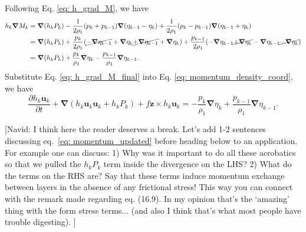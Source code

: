 Following Eq. \eqref{eq: h_grad_M}, we have
\begin{align}
    \begin{split}
        h_{k}\boldsymbol{\nabla} M_{k} & = \boldsymbol{\nabla} (h_{k}P_{k}) - 
        \frac{1}{2\rho_{1}}(p_{k} + p_{k-1}) \boldsymbol{\nabla} (\eta_{k-1} - \eta_{k}) + 
        \frac{1}{2\rho_{1}}(p_{k} - p_{k-1}) \boldsymbol{\nabla} (\eta_{k-1} + \eta_{k}) \\ 
        & = \boldsymbol{\nabla} (h_{k}P_{k}) + 
        \frac{p_{k}}{2\rho_{1}} (\cancel{-\boldsymbol{\nabla} \eta_{k-1}} + \boldsymbol{\nabla} \eta_{k} \cancel{+ \boldsymbol{\nabla} \eta_{k-1}}  + \boldsymbol{\nabla} \eta_{k} ) + 
        \frac{p_{k-1}}{2\rho_{1}} (- \boldsymbol{\nabla} \eta_{k-1} \cancel{+\boldsymbol{\nabla} \eta_{k}} - \boldsymbol{\nabla} \eta_{k-1}  \cancel{- \boldsymbol{\nabla} \eta_{k}}) \\
        & = \boldsymbol{\nabla} (h_{k}P_{k}) + \frac{p_{k}}{\rho_{1}} \boldsymbol{\nabla} \eta_{k} - \frac{p_{k-1}}{\rho_{1}} \boldsymbol{\nabla} \eta_{k-1}.
    \end{split}
    \label{eq: h_grad_M_final}
\end{align} 
Substitute Eq. \eqref{eq: h_grad_M_final} into Eq. \eqref{eq: momentum_density_coord}, we have
\begin{equation}
    \frac{\partial h_{k}\boldsymbol{u}_{k}}{\partial t} + \boldsymbol{\nabla} ( h_{k} \boldsymbol{u}_{k} \boldsymbol{u}_{k} + h_{k} P_{k} ) + f \boldsymbol{z} \times h_{k} \boldsymbol{u}_{k} = - \frac{p_{k}}{\rho_{1}} \boldsymbol{\nabla} \eta_{k} + \frac{p_{k-1}}{\rho_{1}} \boldsymbol{\nabla} \eta_{k-1}.
    \label{eq: momentum_updated}
\end{equation}

{\color{red}[Navid: I think here the reader deserves a break. Let's add 1-2 sentences discussing eq.~\eqref{eq: momentum_updated} before heading below to an application. For example one can discuss: 1) Why was it important to do all these acrobatics so that we pulled the $h_k P_k$ term inside the divergence on the LHS? 2) What do the terms on the RHS are? Say that these terms induce momentum exchange between layers in the absence of any frictional stress! This way you can connect with the remark made regarding eq. (16.9). In my opinion that's the `amazing' thing with the form stress terms... (and also I think that's what most people have trouble digesting). ]}




